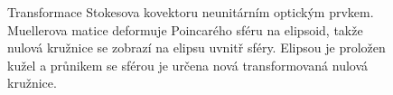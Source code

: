 \begin{figure}[htbp]
    \centering
    \caption{Transformace Stokesova kovektoru neunitárním optickým prvkem. Muellerova matice deformuje Poincarého sféru na elipsoid, takže nulová kružnice se zobrazí na elipsu uvnitř sféry. Elipsou je proložen kužel a průnikem se sférou je určena nová transformovaná nulová kružnice.}
    \label{fig:kovektor-akce-H}
\end{figure}
